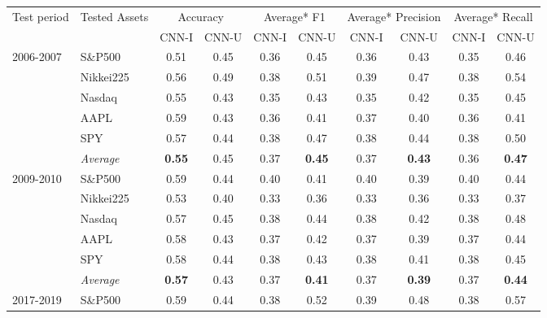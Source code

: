 \documentclass[11pt, a4paper]{article}
\begin{document}
\begin{table}[H]
\begin{tabular}{l|l|cc|cc|cc|cc}
\multicolumn{1}{m{1cm}|}{\multirow{2}{1cm}{Test period}} & \multicolumn{1}{m{1.5cm}|}{\multirow{2}{1.5cm}{Tested Assets}} & \multicolumn{2}{c|}{Accuracy} & \multicolumn{2}{c|}{Average* F1} & \multicolumn{2}{c|}{Average* Precision} & \multicolumn{2}{c}{Average* Recall}  \\
\cline{3-10}
&& CNN-I & CNN-U & CNN-I & CNN-U & CNN-I & CNN-U & CNN-I & CNN-U \\ \hline \hline
\multirow{6}{1cm}{2006-2007} & S\&P500          & 0.51          & 0.45 & 0.36 & 0.45          & 0.36 & 0.43          & 0.35 & 0.46          \\
& Nikkei225        & 0.56          & 0.49 & 0.38 & 0.51          & 0.39 & 0.47          & 0.38 & 0.54          \\
& Nasdaq           & 0.55          & 0.43 & 0.35 & 0.43          & 0.35 & 0.42          & 0.35 & 0.45          \\
& AAPL             & 0.59          & 0.43 & 0.36 & 0.41          & 0.37 & 0.40          & 0.36 & 0.41          \\
& SPY              & 0.57          & 0.44 & 0.38 & 0.47          & 0.38 & 0.44          & 0.38 & 0.50          \\ \cline{2-10}
& \textit{Average} & \textbf{0.55} & 0.45 & 0.37 & \textbf{0.45} & 0.37 & \textbf{0.43} & 0.36 & \textbf{0.47} \\ \hline
\multirow{6}{1cm}{2009-2010} & S\&P500          & 0.59          & 0.44 & 0.40 & 0.41          & 0.40 & 0.39          & 0.40 & 0.44          \\
& Nikkei225        & 0.53          & 0.40 & 0.33 & 0.36          & 0.33 & 0.36          & 0.33 & 0.37          \\
& Nasdaq           & 0.57          & 0.45 & 0.38 & 0.44          & 0.38 & 0.42          & 0.38 & 0.48          \\
& AAPL             & 0.58          & 0.43 & 0.37 & 0.42          & 0.37 & 0.39          & 0.37 & 0.44          \\
& SPY              & 0.58          & 0.44 & 0.38 & 0.43          & 0.38 & 0.41          & 0.38 & 0.45          \\ \cline{2-10}
& \textit{Average} & \textbf{0.57} & 0.43 & 0.37 & \textbf{0.41} & 0.37 & \textbf{0.39} & 0.37 & \textbf{0.44} \\ \hline
\multirow{6}{1cm}{2017-2019} & S\&P500          & 0.59          & 0.44 & 0.38 & 0.52          & 0.39 & 0.48          & 0.38 & 0.57          \\

\end{tabular}
\end{table}
\end{document}
